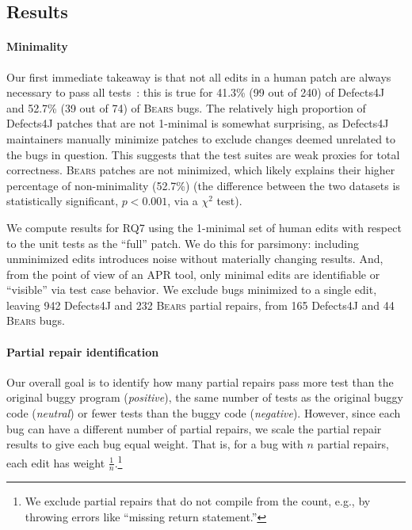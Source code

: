 \documentclass[10pt, conference]{IEEEtran}
\newcommand\bears{\textsc{Bears}\xspace}
\begin{document}
\subsection{Results}

\paragraph{Minimality} Our first immediate takeaway is that not all edits
in a human patch are always necessary to pass all tests~\cite{api-refactoring,
  tangledchanges}:
this is true for 41.3\%  (99 out of 240) of Defects4J and 52.7\% (39 out of 74) of
\bears bugs. 
The relatively high proportion of Defects4J patches that are not 1-minimal is
somewhat surprising, as Defects4J maintainers manually minimize patches to exclude
changes deemed unrelated to the bugs in question.
This suggests that the test suites are weak proxies for total correctness.
\bears patches are not minimized, which likely explains
their higher percentage of non-minimality (52.7\%) (the difference between the two datasets is statistically
significant, $p < 0.001$, via a 
$\chi^2$ test).

We compute results for RQ7 using the 1-minimal set of human edits
with respect to the unit tests as the ``full'' patch.
We do this for parsimony: including
unminimized edits introduces noise without materially changing
results.  And, from the point of view of an APR tool, only
minimal edits are identifiable or ``visible'' via test case behavior. 
We exclude bugs
minimized to a single edit, leaving
942 Defects4J and 232 \bears partial repairs, from
165 Defects4J and 44 \bears bugs.  


\paragraph{Partial repair identification} Our overall goal is to identify how many partial repairs pass more test than the
original buggy program  (\emph{positive}), the  same number of tests as the
original buggy code (\emph{neutral}) or fewer tests than the buggy code
(\emph{negative}).  However, 
since each bug can have a different 
number of partial repairs, we
scale the partial repair results to give each bug equal weight.
That is, for a bug with $n$ partial repairs, each edit has weight 
$\frac{1}{n}$.\footnote{We exclude partial
repairs that do not compile from the count, e.g., by throwing errors like ``missing return statement.''}
\end{document}
